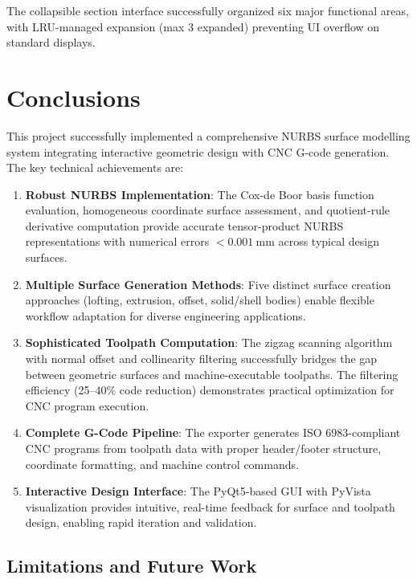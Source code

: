 \documentclass[a4paper,12pt]{article}
\begin{document}
The collapsible section interface successfully organized six major functional
areas, with LRU-managed expansion (max 3 expanded) preventing UI overflow on
standard displays.

\section{Conclusions}

This project successfully implemented a comprehensive NURBS surface modelling
system integrating interactive geometric design with CNC G-code generation.
The key technical achievements are:

\begin{enumerate}
  \item \textbf{Robust NURBS Implementation}: The Cox-de Boor basis function
    evaluation, homogeneous coordinate surface assessment, and quotient-rule
    derivative computation provide accurate tensor-product NURBS representations
    with numerical errors $< 0.001~\text{mm}$ across typical design surfaces.

  \item \textbf{Multiple Surface Generation Methods}: Five distinct surface
    creation approaches (lofting, extrusion, offset, solid/shell bodies) enable
    flexible workflow adaptation for diverse engineering applications.

  \item \textbf{Sophisticated Toolpath Computation}: The zigzag scanning
    algorithm with normal offset and collinearity filtering successfully bridges
    the gap between geometric surfaces and machine-executable toolpaths. The
    filtering efficiency (25--40\% code reduction) demonstrates practical
    optimization for CNC program execution.

  \item \textbf{Complete G-Code Pipeline}: The exporter generates ISO 6983-compliant
    CNC programs from toolpath data with proper header/footer structure,
    coordinate formatting, and machine control commands.

  \item \textbf{Interactive Design Interface}: The PyQt5-based GUI with PyVista
    visualization provides intuitive, real-time feedback for surface and
    toolpath design, enabling rapid iteration and validation.
\end{enumerate}

\subsection{Limitations and Future Work}
\end{document}
